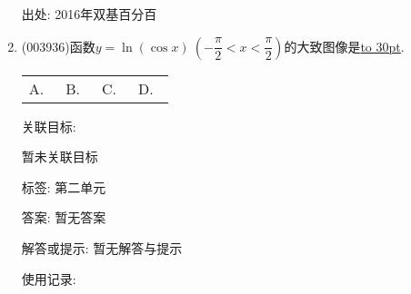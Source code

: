 \documentclass[10pt,a4paper]{article}
\newcommand{\blank}[1]{\underline{\hbox to #1pt{}}}
\newcommand{\fourch}[4]{\par\begin{tabular}{p{.23\textwidth}p{.23\textwidth}p{.23\textwidth}p{.23\textwidth}}
A.~#1 &B.~#2& C.~#3& D.~#4
\end{tabular}}
\begin{document}
\begin{enumerate}[1.]
出处: 2016年双基百分百
\item { (003936)}函数$y=\ln(\cos x) \ \left(-\dfrac{\pi}{2}<x<\dfrac{\pi}{2}\right)$的大致图像是\blank{30}.
\fourch{\begin{tikzpicture}[samples=200,>=stealth]
	\draw [->](-1.5,0)--(0,0) node [above left] {$O$}--(1.5,0) node [below] {$x$};
	\draw [->](0,-1.5)--(0,1.5) node [left] {$y$};
	\draw [dashed] (-1,-1.5)--(-1,1.5) (1,-1.5)--(1,1.5);
	\draw (-1,0) node [below left] {$-\dfrac{\pi}{2}$};
	\draw (1,0) node  [below right] {$\dfrac{\pi}{2}$};
	\draw [domain=-75:75] plot ({\x/90},{ln(cos(\x))});
	\end{tikzpicture}}{\begin{tikzpicture}[samples=200,>=stealth]
	\draw [->](-1.5,0)--(0,0) node [above left] {$O$}--(1.5,0) node [below] {$x$};
	\draw [->](0,-1.5)--(0,1.5) node [left] {$y$};
	\draw [dashed] (-1,-1.5)--(-1,1.5) (1,-1.5)--(1,1.5);
	\draw (-1,0) node [below left] {$-\dfrac{\pi}{2}$};
	\draw (1,0) node  [below right] {$\dfrac{\pi}{2}$};
	\draw [domain=-75:0] plot ({\x/90},{ln(cos(\x))});
	\draw [domain=0:75] plot ({\x/90},{-ln(cos(\x))});
	\end{tikzpicture}}{\begin{tikzpicture}[samples=200,>=stealth]
	\draw [->](-1.5,0)--(0,0) node [below left] {$O$}--(1.5,0) node [below] {$x$};
	\draw [->](0,-1.5)--(0,1.5) node [left] {$y$};
	\draw [dashed] (-1,-1.5)--(-1,1.5) (1,-1.5)--(1,1.5);
	\draw (-1,0) node [below left] {$-\dfrac{\pi}{2}$};
	\draw (1,0) node  [below right] {$\dfrac{\pi}{2}$};
	\draw [domain=-75:0] plot ({\x/90},{-ln(cos(\x))});
	\draw [domain=0:75] plot ({\x/90},{ln(cos(\x))});
	\end{tikzpicture}}{\begin{tikzpicture}[samples=200,>=stealth]
	\draw [->](-1.5,0)--(0,0) node [below left] {$O$}--(1.5,0) node [below] {$x$};
	\draw [->](0,-1.5)--(0,1.5) node [left] {$y$};
	\draw [dashed] (-1,-1.5)--(-1,1.5) (1,-1.5)--(1,1.5);
	\draw (-1,0) node [below left] {$-\dfrac{\pi}{2}$};
	\draw (1,0) node  [below right] {$\dfrac{\pi}{2}$};
	\draw [domain=-75:75] plot ({\x/90},{-ln(cos(\x))});
	\end{tikzpicture}}


关联目标:

暂未关联目标



标签: 第二单元

答案: 暂无答案

解答或提示: 暂无解答与提示

使用记录:


\end{enumerate}
\end{document}
